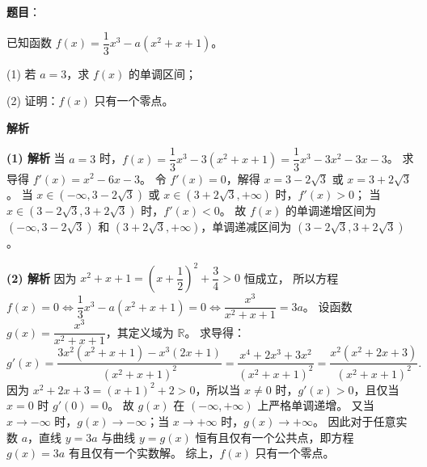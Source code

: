 \begin{answer}

\textbf{题目}：

已知函数 $f(x)=\dfrac13 x^3-a(x^2+x+1)$。

(1) 若 $a=3$，求 $f(x)$ 的单调区间；

(2) 证明：$f(x)$ 只有一个零点。

\textbf{解析}

\textbf{(1) 解析} 当 $a=3$ 时，$f(x) = \dfrac13 x^3 - 3(x^2+x+1) = \dfrac13 x^3 - 3x^2 - 3x - 3$。
求导得 $f'(x) = x^2-6x-3$。
令 $f'(x)=0$，解得 $x = 3-2\sqrt3$ 或 $x = 3+2\sqrt3$。
当 $x\in(-\infty, 3-2\sqrt3)$ 或 $x\in(3+2\sqrt3, +\infty)$ 时，$f'(x)>0$；
当 $x\in(3-2\sqrt3, 3+2\sqrt3)$ 时，$f'(x)<0$。
故 $f(x)$ 的单调递增区间为 $(-\infty, 3-2\sqrt3)$ 和 $(3+2\sqrt3, +\infty)$，单调递减区间为 $(3-2\sqrt3, 3+2\sqrt3)$。

\textbf{(2) 解析} 因为 $x^2+x+1 = \left(x+\dfrac12\right)^2+\dfrac34 > 0$ 恒成立，
所以方程 $f(x)=0 \iff \dfrac13 x^3 - a(x^2+x+1) = 0 \iff \dfrac{x^3}{x^2+x+1} = 3a$。
设函数 $g(x) = \dfrac{x^3}{x^2+x+1}$，其定义域为 $\mathbb R$。
求导得：
\nopagebreak[4]
\[g'(x) = \dfrac{3x^2(x^2+x+1) - x^3(2x+1)}{(x^2+x+1)^2} = \dfrac{x^4+2x^3+3x^2}{(x^2+x+1)^2} = \dfrac{x^2(x^2+2x+3)}{(x^2+x+1)^2}.\]
因为 $x^2+2x+3 = (x+1)^2+2 > 0$，所以当 $x\ne 0$ 时，$g'(x)>0$，且仅当 $x=0$ 时 $g'(0)=0$。
故 $g(x)$ 在 $(-\infty, +\infty)$ 上严格单调递增。
又当 $x\to -\infty$ 时，$g(x)\to -\infty$；当 $x\to +\infty$ 时，$g(x)\to +\infty$。
因此对于任意实数 $a$，直线 $y=3a$ 与曲线 $y=g(x)$ 恒有且仅有一个公共点，即方程 $g(x)=3a$ 有且仅有一个实数解。
综上，$f(x)$ 只有一个零点。



\end{answer}
